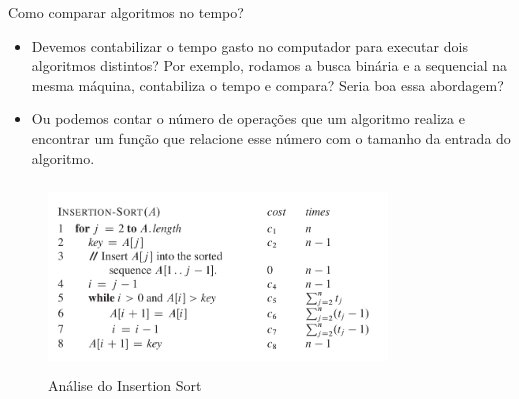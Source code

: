 \begin{frame}
\begin{block}{Como comparar algoritmos no tempo?}
	\begin{itemize}
		\item Devemos contabilizar o tempo gasto no computador para executar dois algoritmos distintos? Por exemplo, rodamos a busca binária e a sequencial na mesma máquina, contabiliza o tempo e compara? Seria boa essa abordagem?

		\item Ou podemos contar o número de operações que um algoritmo realiza e encontrar um função que relacione esse número com o tamanho da entrada do algoritmo.
		
	\end{itemize}
\end{block}
\end{frame}

\begin{frame}	
	\begin{block}{}	
		 \begin{figure}[!htb]
			\centering	  				
			\includegraphics[height=5cm, width = 9cm]{./pic/insertionSort.png}
			\caption{Análise do Insertion Sort \cite{Cormen2009}}
			\label{fig_analise_insertion}
		\end{figure}
	\end{block}
\end{frame}


